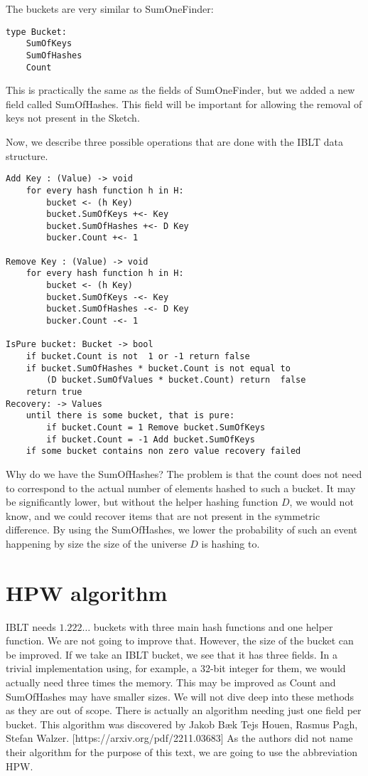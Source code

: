 The buckets are very similar to SumOneFinder:
\begin{lstlisting}
type Bucket:
    SumOfKeys
    SumOfHashes
    Count
\end{lstlisting}
This is practically the same as the fields of SumOneFinder, but we added a new field called SumOfHashes. This field will be important for allowing the removal of keys not present in the Sketch.

Now, we describe three possible operations that are done with the IBLT data structure.
\begin{lstlisting}
Add Key : (Value) -> void
    for every hash function h in H:
        bucket <- (h Key)
        bucket.SumOfKeys +<- Key
        bucket.SumOfHashes +<- D Key
        bucker.Count +<- 1
    
Remove Key : (Value) -> void
    for every hash function h in H:
        bucket <- (h Key)
        bucket.SumOfKeys -<- Key
        bucket.SumOfHashes -<- D Key
        bucker.Count -<- 1

IsPure bucket: Bucket -> bool
    if bucket.Count is not  1 or -1 return false
    if bucket.SumOfHashes * bucket.Count is not equal to
        (D bucket.SumOfValues * bucket.Count) return  false
    return true
Recovery: -> Values
    until there is some bucket, that is pure:
        if bucket.Count = 1 Remove bucket.SumOfKeys
        if bucket.Count = -1 Add bucket.SumOfKeys
    if some bucket contains non zero value recovery failed
\end{lstlisting}

Why do we have the SumOfHashes? The problem is that the count does not need to correspond to the actual number of elements hashed to such a bucket. It may be significantly lower, but without the helper hashing function $D$, we would not know, and we could recover items that are not present in the symmetric difference. By using the SumOfHashes, we lower the probability of such an event happening by size the size of the universe $D$ is hashing to.

\section{HPW algorithm}
IBLT needs $1.222\dots$ buckets with three main hash functions and one helper function. We are not going to improve that. However, the size of the bucket can be improved. If we take an IBLT bucket, we see that it has three fields. In a trivial implementation using, for example, a 32-bit integer for them, we would actually need three times the memory. This may be improved as Count and SumOfHashes may have smaller sizes. We will not dive deep into these methods as they are out of scope. There is actually an algorithm needing just one field per bucket. This algorithm was discovered by Jakob Bæk Tejs Houen,
Rasmus Pagh, 
Stefan Walzer. [https://arxiv.org/pdf/2211.03683] As the authors did not name their algorithm for the purpose of this text, we are going to use the abbreviation HPW. 

